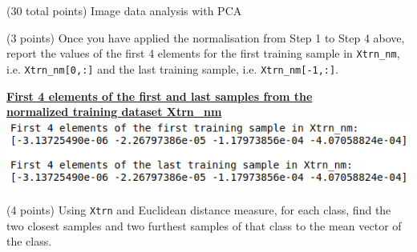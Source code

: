 \documentclass[12pt]{article}
\begin{document}
\clearpage
%
%

\begin{question}{(30 total points) Image data analysis with PCA}

  
  

  
  \medskip

  \begin{subquestion}{(3 points)
      Once you have applied the normalisation from Step 1 to Step 4 above,
      report the values of the first 4 elements for the first training
      sample in \texttt{Xtrn\_nm},
      i.e. \texttt{Xtrn\_nm[0,:]} and the last training sample,
      i.e. \texttt{Xtrn\_nm[-1,:]}.
    } \label{Q1.1}
    

      \begin{answerbox}{12em}
        \begin{center}
        \textbf{\underline{First 4 elements of the first and last samples from the}}\\
        \textbf{\underline{normalized training dataset Xtrn\_nm}}
        \vspace{0.3cm}\\
         \includegraphics[width=1\textwidth]{images/q11.png}
        \end{center}
      \end{answerbox}
  


   \end{subquestion}
   \begin{subquestion}{(4 points)
      Using {\tt Xtrn} and Euclidean distance
      measure, for each class,
      find the two closest samples and two furthest
      samples of that class to the mean vector of the class.
    }  \label{Q1.2}





\end{subquestion}
\end{question}
\end{document}
